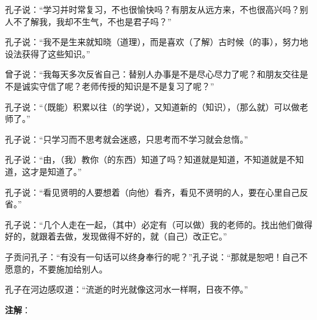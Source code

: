 \documentclass[12pt,UTF-8,openany]{ctexbook}
\begin{document}
\begin{normalsize}
    
    孔子说：“学习并时常复习，不也很愉快吗？有朋友从远方来，不也很高兴吗？别人不了解我，我却不生气，不也是君子吗？”
    
    孔子说：“我不是生来就知晓（道理），而是喜欢（了解）古时候（的事），努力地设法获得了这些知识。”
    
    曾子说：“我每天多次反省自己：替别人办事是不是尽心尽力了呢？和朋友交往是不是诚实守信了呢？老师传授的知识是不是复习了呢？”
    
    孔子说：“（既能）积累以往（的学说），又知道新的（知识），（那么就）可以做老师了。”
    
    孔子说：“只学习而不思考就会迷惑，只思考而不学习就会怠惰。”
    
    孔子说：“由，（我）教你（的东西）知道了吗？知道就是知道，不知道就是不知道，这才是知道了。”
    
    孔子说：“看见贤明的人要想着（向他）看齐，看见不贤明的人，要在心里自己反省。”
    
    孔子说：“几个人走在一起，（其中）必定有（可以做）我的老师的。找出他们做得好的，就跟着去做，发现做得不好的，就（自己）改正它。”
    
    子贡问孔子：“有没有一句话可以终身奉行的呢？”孔子说：“那就是恕吧！自己不愿意的，不要施加给别人。
    
    孔子在河边感叹道：“流逝的时光就像这河水一样啊，日夜不停。”
    
\end{normalsize}


\newpage

\textbf{注解}：

\vspace{-1em}
\end{document}
